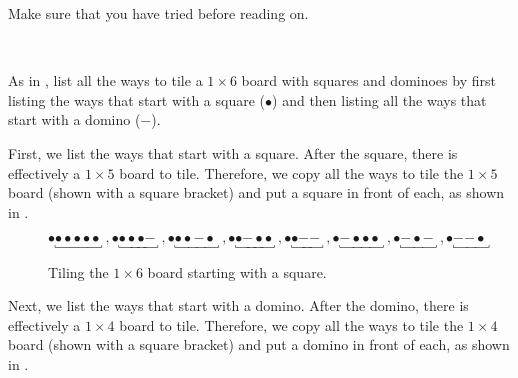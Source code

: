 Make sure that you have tried  before reading on.  

\begin{exam}
\label{exam_sq_dom6}  
~
    \begin{actpart}
        \item As in , list all the ways to tile a $1 \times 6$ board with squares and dominoes by first listing the ways that start with a square ($\bullet$) and then listing all the ways that start with a domino ($\boldsymbol{-}$).
            \begin{soln}
                First, we list the ways that start with a square.  After the square, there is effectively a $1 \times 5$ board to tile.  Therefore, we copy all the ways to tile the $1 \times 5$ board (shown with a square bracket) and put a square in front of each, as shown in .

                \begin{figure}[hbtp]
                    \centering
                    $$\bullet \underbracket{\bullet \bullet \bullet \bullet \bullet~}~,
                    \bullet \underbracket{\bullet \bullet \bullet \boldsymbol{-}~}~,
                    \bullet \underbracket{\bullet \bullet \boldsymbol{-} \bullet~}~,
                    \bullet \underbracket{\bullet \boldsymbol{-} \bullet \bullet~}~,
                    \bullet \underbracket{\bullet \boldsymbol{-} \boldsymbol{-}~}~,
                    \bullet \underbracket{\boldsymbol{-} \bullet \bullet \bullet~}~,
                    \bullet \underbracket{\boldsymbol{-}  \bullet \boldsymbol{-}~}~,
                    \bullet \underbracket{\boldsymbol{-}  \boldsymbol{-}\bullet~}
                    $$
                    \caption{Tiling the $1 \times 6$ board starting with a square.}
                    \label{fig_sq_dom6_start1}
                \end{figure}
                
                Next, we list the ways that start with a domino.  After the domino, there is effectively a $1 \times 4$ board to tile.  Therefore, we copy all the ways to tile the $1 \times 4$ board (shown with a square bracket) and put a domino in front of each, as shown in .
                

\end{soln}
\end{actpart}
\end{exam}
